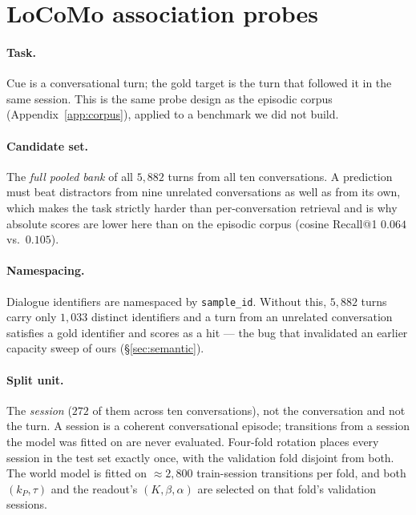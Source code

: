
\section{LoCoMo association probes}
\label{app:locomo}

\paragraph{Task.} Cue is a conversational turn; the gold target is the turn that followed it
in the same session. This is the same probe design as the episodic corpus
(Appendix~\ref{app:corpus}), applied to a benchmark we did not build.

\paragraph{Candidate set.} The \emph{full pooled bank} of all $5{,}882$ turns from all ten
conversations. A prediction must beat distractors from nine unrelated conversations as well
as from its own, which makes the task strictly harder than per-conversation retrieval and is
why absolute scores are lower here than on the episodic corpus (cosine Recall@1 $0.064$
vs.\ $0.105$).

\paragraph{Namespacing.} Dialogue identifiers are namespaced by \texttt{sample\_id}. Without
this, $5{,}882$ turns carry only $1{,}033$ distinct identifiers and a turn from an unrelated
conversation satisfies a gold identifier and scores as a hit --- the bug that invalidated an
earlier capacity sweep of ours (\S\ref{sec:semantic}).

\paragraph{Split unit.} The \emph{session} ($272$ of them across ten conversations), not the
conversation and not the turn. A session is a coherent conversational episode; transitions
from a session the model was fitted on are never evaluated. Four-fold rotation places every
session in the test set exactly once, with the validation fold disjoint from both. The world
model is fitted on ${\approx}2{,}800$ train-session transitions per fold, and both
$(k_P,\tau)$ and the readout's $(K,\beta,\alpha)$ are selected on that fold's validation
sessions.

